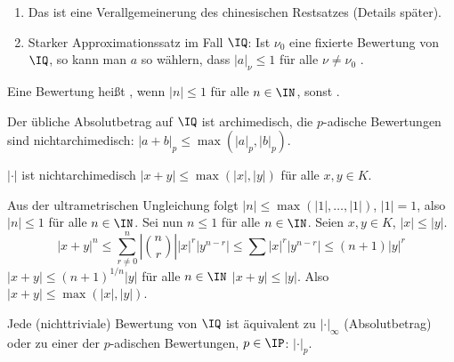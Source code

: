 \begin{Bemerkung}
 \begin{enumerate}
  \item Das ist eine Verallgemeinerung des chinesischen Restsatzes (Details später).
  \item Starker Approximationssatz im Fall $\IQ$: Ist $\nu_0$ eine fixierte Bewertung von $\IQ$, so kann man $a$ so wählern, dass $|a|_\nu\leq 1$ für alle $\nu\neq\nu_0$ .
 \end{enumerate}
\end{Bemerkung}

\begin{Definition}
 Eine Bewertung heißt , wenn $|n|\leq 1$ für alle $n\in\IN$, sonst .
\end{Definition}

\begin{Beispiel}
 Der übliche Absolutbetrag auf $\IQ$ ist archimedisch, die $p$-adische Bewertungen sind nichtarchimedisch: $|a+b|_p\leq \max(|a|_p,|b|_p)$.
\end{Beispiel}

\begin{Fakt}
 $|\cdot|$ ist nichtarchimedisch \gdw $|x+y|\leq \max(|x|,|y|)$ für alle $x,y\in K$.
\end{Fakt}

\begin{Beweis}
 Aus der ultrametrischen Ungleichung folgt $|n|\leq \max(|1|,\ldots,|1|)$, $|1|=1$, also $|n|\leq 1$ für alle $n\in \IN$. Sei nun $n\leq 1$ für alle $n\in\IN$. Seien $x,y\in K$, $|x|\leq |y|$.
 \[ |x+y|^n\leq \sum_{r\neq 0}^n |\binom{n}{r}||x|^r|y^{n-r}|\leq \sum |x|^r|y^{n-r}|\leq (n+1)|y|^r\]
 \folge $|x+y|\leq (n+1)^{1/n}|y|$ für alle $n\in\IN$ \folge $|x+y|\leq |y|$. Also $|x+y|\leq \max(|x|,|y|)$.
\end{Beweis}

\begin{Satz}[OSTROWSKI]
 Jede (nichttriviale) Bewertung von $\IQ$ ist äquivalent zu $|\cdot|_\infty$ (Absolutbetrag) oder zu einer der $p$-adischen Bewertungen, $p\in\IP$: $|\cdot|_p$.
\end{Satz}


